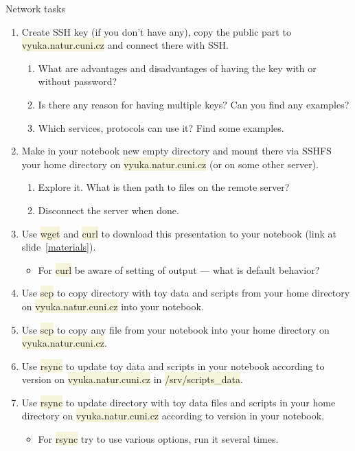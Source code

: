 \documentclass[compress, xelatex, 11pt, xcolor=svgnames, aspectratio=169, url={hyphens, lowtilde}]{beamer}
\renewcommand{\texttt}[1]{\colorbox{Beige}{{\ttfamily #1}}}
\begin{document}
\begin{frame}[allowframebreaks]{Network tasks}
	\begin{enumerate}
		\item Create SSH key (if you don't have any), copy the public part to \texttt{vyuka.natur.cuni.cz} and connect there with SSH.
		\begin{enumerate}
			\item What are advantages and disadvantages of having the key with or without password?
			\item Is there any reason for having multiple keys? Can you find any examples?
			\item Which services, protocols can use it? Find some examples.
		\end{enumerate}
		\item Make in your notebook new empty directory and mount there via SSHFS your home directory on \texttt{vyuka.natur.cuni.cz} (or on some other server).
		\begin{enumerate}
			\item Explore it. What is then path to files on the remote server?
			\item Disconnect the server when done.
		\end{enumerate}
		\item Use \texttt{wget} and \texttt{curl} to download this presentation to your notebook (link at slide~\ref{materials}).
		\begin{itemize}
			\item For \texttt{curl} be aware of setting of output --- what is default behavior?
		\end{itemize}
		\item Use \texttt{scp} to copy directory with toy data and scripts from your home directory on \texttt{vyuka.natur.cuni.cz} into your notebook.
		\item Use \texttt{scp} to copy any file from your notebook into your home directory on \texttt{vyuka.natur.cuni.cz}.
		\item Use \texttt{rsync} to update toy data and scripts in your notebook according to version on \texttt{vyuka.natur.cuni.cz} in \texttt{/srv/scripts\_data}.
		\item Use \texttt{rsync} to update directory with toy data files and scripts in your home directory on \texttt{vyuka.natur.cuni.cz} according to version in your notebook.
		\begin{itemize}
			\item For \texttt{rsync} try to use various options, run it several times.

\end{itemize}
\end{enumerate}
\end{frame}
\end{document}
